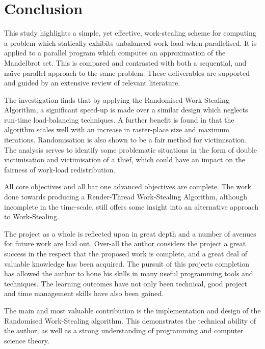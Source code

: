 \newpage
\section{Conclusion}

This study highlights a simple, yet effective, work-stealing scheme for computing a problem which statically exhibits unbalanced work-load when parallelised. 
It is applied to a parallel program which computes an approximation of the Mandelbrot set. This is compared and contrasted with both a sequential,
and na\"{\i}ve parallel approach to the same problem. These deliverables are supported and guided by an extensive review of relevant literature.

The investigation finds that by applying the Randomised Work-Stealing Algorithm, a significant speed-up is made over a similar design which 
neglects run-time load-balancing techniques. A further benefit is found in that the algorithm scales well with an increase in raster-place size and 
maximum iterations. Randomisation is also shown to be a fair method for victimisation. The analysis serves to identify some problematic situations
in the form of double victimisation and victimisation of a thief, which could have an impact on the fairness of work-load redistribution. 

All core objectives and all bar one advanced objectives are complete. The work done towards producing a Render-Thread Work-Stealing Algorithm, although incomplete
in the time-scale, still offers some insight into an alternative approach to Work-Stealing.

The project as a whole is reflected upon in great depth and a number of avenues for future work are laid out. Over-all the author considers the project 
a great success in the respect that the proposed work is complete, and a great deal of valuable knowledge has been acquired.
The pursuit of this projects completion has allowed the author to hone his skills in many useful programming tools and techniques.
The learning outcomes have not only been technical, good project and time management skills have also been gained. 

The main and most valuable contribution is the implementation and design of the Randomised Work-Stealing algorithm. This demonstrates 
the technical ability of the author, as well as a strong understanding of programming and computer science theory.

